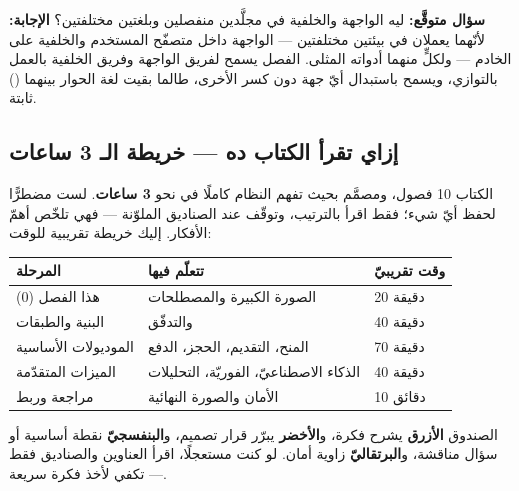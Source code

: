 \begin{qa}
\textbf{سؤال متوقَّع:} ليه الواجهة والخلفية في مجلَّدين منفصلين وبلغتين مختلفتين؟
\newline
\textbf{الإجابة:} لأنّهما يعملان في بيئتين مختلفتين — الواجهة داخل متصفّح المستخدم
والخلفية على الخادم — ولكلٍّ منهما أدواته المثلى. الفصل يسمح لفريق الواجهة وفريق
الخلفية بالعمل بالتوازي، ويسمح باستبدال أيّ جهة دون كسر الأخرى، طالما بقيت لغة الحوار
بينهما () ثابتة.
\end{qa}

\subsection{إزاي تقرأ الكتاب ده — خريطة الـ 3 ساعات}

الكتاب 10 فصول، ومصمَّم بحيث تفهم النظام كاملًا في نحو \textbf{3 ساعات}. لست مضطرًّا
لحفظ أيّ شيء؛ فقط اقرأ بالترتيب، وتوقّف عند الصناديق الملوّنة — فهي تلخّص أهمّ الأفكار.
إليك خريطة تقريبية للوقت:

\begin{center}
\begin{tabular}{L{4.5cm} L{5cm} C{2.4cm}}
\toprule
\textbf{\color{spPrimary}المرحلة} & \textbf{\color{spPrimary}تتعلّم فيها} & \textbf{\color{spPrimary}وقت تقريبيّ} \\
\midrule
هذا الفصل (0) & الصورة الكبيرة والمصطلحات & 20 دقيقة \\
البنية والطبقات &  والتدفّق & 40 دقيقة \\
الموديولات الأساسية & المنح، التقديم، الحجز، الدفع & 70 دقيقة \\
الميزات المتقدّمة & الذكاء الاصطناعيّ، الفوريّة، التحليلات & 40 دقيقة \\
مراجعة وربط & الأمان والصورة النهائية & 10 دقائق \\
\bottomrule
\end{tabular}
\end{center}

\begin{note}
الصندوق \textbf{الأزرق} يشرح فكرة، و\textbf{الأخضر} يبرّر قرار تصميم، و\textbf{البنفسجيّ}
نقطة أساسية أو سؤال مناقشة، و\textbf{البرتقاليّ} زاوية أمان. لو كنت مستعجلًا، اقرأ
العناوين والصناديق فقط — تكفي لأخذ فكرة سريعة.
\end{note}


